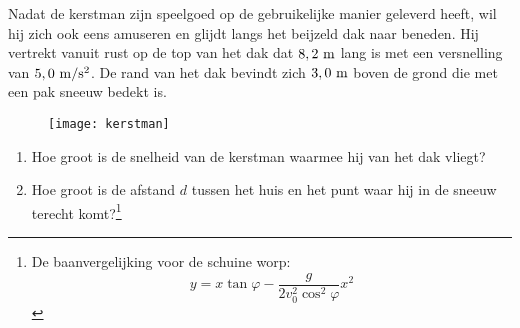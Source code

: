 \documentclass{ximera}
\begin{document}
\begin{exercise} Nadat de kerstman zijn speelgoed op de
gebruikelijke manier geleverd heeft, wil hij zich ook eens amuseren
en glijdt langs het beijzeld dak naar beneden. Hij vertrekt vanuit
rust op de top van het dak dat $8,2~\rm m$ lang is met een
versnelling van $5,0~\rm m/s^2$. De rand van het dak bevindt zich
$3,0~\rm m$ boven de grond die met een pak sneeuw bedekt is.
\begin{figure}[h]
\begin{center}
\texttt{[image: kerstman]}
\end{center}
\end{figure}
\begin{enumerate}
\item Hoe groot is de snelheid van de kerstman waarmee hij van het
dak vliegt?
\item Hoe groot is de afstand $d$ tussen het huis en het punt waar
hij in de sneeuw terecht komt?\footnote{De baanvergelijking voor de
schuine worp:
\[
y=x\tan\varphi-\frac{g}{2v_0^2\cos^2\varphi}x^2
\]}
\end{enumerate}

\end{exercise}
\end{document}
